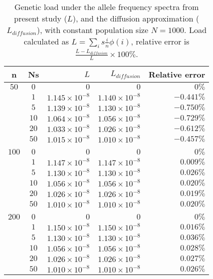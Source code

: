 \documentclass[preview]{standalone}
\begin{document}
\begin{table}
    \centering
    \begin{tabular}{c c r r r }
        n & Ns & $L$ & $L_{diffusion}$ & Relative error \\
        \hline
        $50$  & $0$  & $       0$ & $       0$ & $0\%$ \\
              & $1$  & $1.145 \times 10^{-8}$ & $1.140 \times 10^{-8}$ & $-0.441\%$ \\
              & $5$  & $1.139 \times 10^{-8}$ & $1.130 \times 10^{-8}$ & $-0.750\%$ \\
              & $10$ & $1.064 \times 10^{-8}$ & $1.056 \times 10^{-8}$ & $-0.729\%$ \\
              & $20$ & $1.033 \times 10^{-8}$ & $1.026 \times 10^{-8}$ & $-0.612\%$ \\
              & $50$ & $1.015 \times 10^{-8}$ & $1.010 \times 10^{-8}$ & $-0.457\%$ \\
        \\
        $100$ & $0$  & $       0$ & $       0$ & $0\%$ \\
              & $1$  & $1.147 \times 10^{-8}$ & $1.147 \times 10^{-8}$ & $0.009\%$ \\
              & $5$  & $1.130 \times 10^{-8}$ & $1.130 \times 10^{-8}$ & $0.026\%$ \\
              & $10$ & $1.056 \times 10^{-8}$ & $1.056 \times 10^{-8}$ & $0.020\%$ \\
              & $20$ & $1.026 \times 10^{-8}$ & $1.026 \times 10^{-8}$ & $0.019\%$ \\
              & $50$ & $1.010 \times 10^{-8}$ & $1.010 \times 10^{-8}$ & $0.020\%$ \\
        \\
        $200$ & $0$  & $       0$ & $       0$ & $0\%$ \\
              & $1$  & $1.150 \times 10^{-8}$ & $1.150 \times 10^{-8}$ & $0.016\%$ \\
              & $5$  & $1.130 \times 10^{-8}$ & $1.130 \times 10^{-8}$ & $0.036\%$ \\
              & $10$ & $1.056 \times 10^{-8}$ & $1.056 \times 10^{-8}$ & $0.028\%$ \\
              & $20$ & $1.026 \times 10^{-8}$ & $1.026 \times 10^{-8}$ & $0.027\%$ \\
              & $50$ & $1.010 \times 10^{-8}$ & $1.010 \times 10^{-8}$ & $0.026\%$ \\
        \end{tabular}

    \caption{\label{tab_symbols} Genetic load under the allele frequency
    spectra from present study ($L$), and the diffusion approximation
    ($L_{diffusion}$), with constant population size $N=1000$. Load calculated as
    $L=\sum_i s \frac{i}{n} \phi(i)$, relative error is
    $\frac{L-L_{diffusion}}{L}\times100\%$. }

\end{table}
\end{document}
